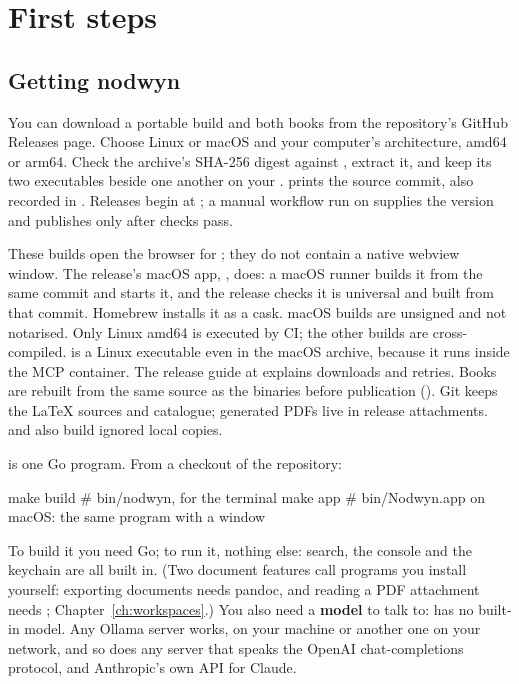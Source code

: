 \chapter{First steps}
\label{ch:first}

\section{Getting nodwyn}

You can download a portable build and both books from the repository's
GitHub Releases page. Choose Linux or
macOS and your computer's architecture, amd64 or arm64. Check the archive's
SHA-256 digest against , extract it, and keep its two
executables beside one another on your . 
prints the source commit, also recorded in . Releases begin
at ; a manual workflow run on  supplies the
version and publishes only after checks pass.

These builds open the browser for ; they do not contain a
native webview window. The release's macOS app,
, does: a macOS runner builds it from the
same commit and starts it, and the release checks it is universal and built
from that commit. Homebrew installs it as a cask. macOS builds are unsigned and not notarised. Only
Linux amd64 is executed by CI; the other builds are cross-compiled.
 is a Linux executable even in the macOS archive,
because it runs inside the MCP container. The release guide at
 explains downloads and retries. Books are rebuilt
from the same source as the binaries before publication (). Git keeps
the LaTeX sources and catalogue; generated PDFs live in release attachments.
 and  also build ignored local copies.

\nodwyn{} is one Go program. From a checkout of the repository:

\begin{sh}
make build        # bin/nodwyn, for the terminal
make app          # bin/Nodwyn.app on macOS: the same program with a window
\end{sh}

To build it you need Go; to run it, nothing else: search, the console and
the keychain are all built in. (Two document features call programs you
install yourself: exporting documents needs pandoc, and reading a PDF
attachment needs ; Chapter~\ref{ch:workspaces}.) You also
need a \textbf{model} to talk to: \nodwyn{} has no built-in model.
Any Ollama server works, on your machine or another one on your network, and
so does any server that speaks the OpenAI chat-completions protocol, and
Anthropic's own API for Claude.

